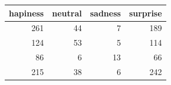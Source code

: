 \begin{tabular}{rrrr}
\toprule
hapiness & neutral & sadness & surprise \\
\midrule
261 & 44 & 7 & 189 \\
124 & 53 & 5 & 114 \\
86 & 6 & 13 & 66 \\
215 & 38 & 6 & 242 \\
\bottomrule
\end{tabular}
